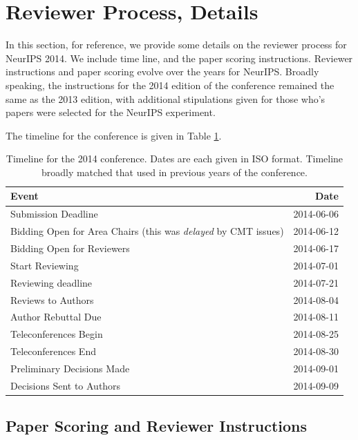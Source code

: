 


\section{Reviewer Process, Details}
\label{app:review-details}

In this section, for reference, we provide some details on the reviewer process for NeurIPS 2014. We include time line, and the paper scoring instructions. Reviewer instructions and paper scoring evolve over the years for NeurIPS. Broadly speaking, the instructions for the 2014 edition of the conference remained the same as the 2013 edition, with additional stipulations given for those who's papers were selected for the NeurIPS experiment.

The timeline for the conference is given in Table \ref{table-reviewing-timeline}.


\begin{table}[hb]
    \centering
    \caption{Timeline for the 2014 conference. Dates are each given in ISO format. Timeline broadly matched that used in previous years of the conference.}
    \label{table-reviewing-timeline}
    
    \begin{tabular}{l|r}
    Event & Date \\ \hline
    
        Submission Deadline & 2014-06-06  \\
        Bidding Open for Area Chairs (this was \emph{delayed} by
  CMT issues) & 2014-06-12 \\
  Bidding Open for Reviewers & 2014-06-17 \\
  Start Reviewing & 2014-07-01 \\
  Reviewing deadline & 2014-07-21 \\
  Reviews to Authors & 2014-08-04 \\
  Author Rebuttal Due & 2014-08-11 \\
  Teleconferences Begin & 2014-08-25 \\
  Teleconferences End & 2014-08-30 \\
  Preliminary Decisions Made & 2014-09-01 \\
  Decisions Sent to Authors & 2014-09-09
    \end{tabular}
    
\end{table}

\subsection{Paper Scoring and Reviewer
Instructions}\label{paper-scoring-and-reviewer-instructions}

